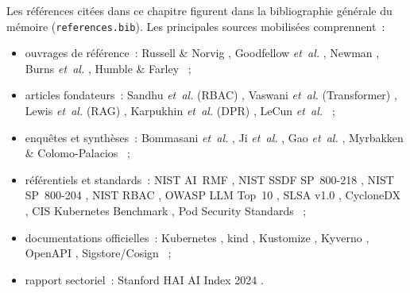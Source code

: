 \noindent Les références citées dans ce chapitre figurent dans la bibliographie générale du mémoire (\texttt{references.bib}). Les principales sources mobilisées comprennent~:
\begin{itemize}
    \item ouvrages de référence~: Russell \& Norvig \cite{russell_norvig_ai}, Goodfellow \textit{et~al.} \cite{goodfellow_deep_learning}, Newman \cite{newman_microservices}, Burns \textit{et~al.} \cite{burns_kubernetes_2022}, Humble \& Farley \cite{humble_continuous_delivery}~;
    \item articles fondateurs~: Sandhu \textit{et~al.} (RBAC) \cite{sandhu_rbac_1996}, Vaswani \textit{et~al.} (Transformer) \cite{vaswani_transformer_2017}, Lewis \textit{et~al.} (RAG) \cite{lewis_rag_2020}, Karpukhin \textit{et~al.} (DPR) \cite{karpukhin_dpr_2020}, LeCun \textit{et~al.} \cite{lecun_deep_learning_2015}~;
    \item enquêtes et synthèses~: Bommasani \textit{et~al.} \cite{bommasani_foundation_models}, Ji \textit{et~al.} \cite{ji_hallucination_survey}, Gao \textit{et~al.} \cite{gao_rag_survey_2024}, Myrbakken \& Colomo-Palacios \cite{myrbakken_devsecops_2017}~;
    \item référentiels et standards~: NIST AI~RMF \cite{nist_ai_rmf_2023}, NIST SSDF SP~800-218 \cite{nist_ssdf_800218}, NIST SP~800-204 \cite{nist_sp_800_204}, NIST RBAC \cite{nist_rbac_standard}, OWASP LLM Top~10 \cite{owasp_llm_top10}, SLSA v1.0 \cite{slsa_spec_v1}, CycloneDX \cite{cyclonedx_spec}, CIS Kubernetes Benchmark \cite{cis_k8s_benchmark}, Pod Security Standards \cite{k8s_pod_security_standards}~;
    \item documentations officielles~: Kubernetes \cite{kubernetes_docs}, kind \cite{kind_docs}, Kustomize \cite{kustomize_docs}, Kyverno \cite{kyverno_docs}, OpenAPI \cite{openapi_spec}, Sigstore/Cosign \cite{sigstore_paper}~;
    \item rapport sectoriel~: Stanford HAI AI Index 2024 \cite{stanford_ai_index_2024}.
\end{itemize}
